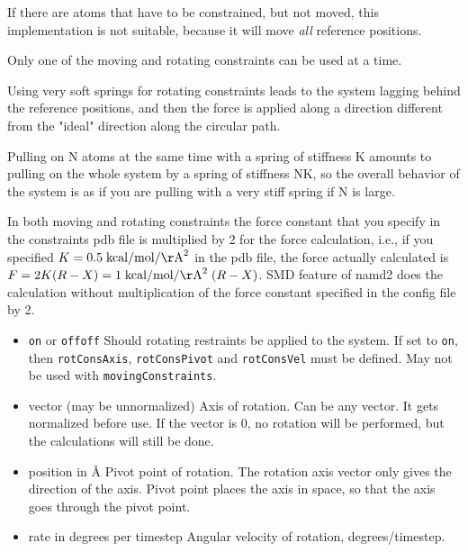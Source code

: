If there are atoms that have to be constrained, but not moved,
this implementation is not suitable, because it will move {\em all}
reference positions.

Only one of the moving and rotating constraints can be used at a
time.

Using very soft springs for rotating constraints leads to the system
   lagging behind the reference positions, and then the force is applied
   along a direction different from the "ideal" direction along the
   circular path.

Pulling on N atoms at the same time with a spring of stiffness K
   amounts to pulling on the whole system by a spring of stiffness NK,
   so the overall behavior of the system is as if you are pulling with a
   very stiff spring if N is large.

In both moving and rotating constraints the force constant that you
   specify in the constraints pdb file is multiplied by 2 for the force
   calculation, i.e., if you specified $K = 0.5 \; {\rm kcal}/{\rm mol}/{\rm \AA}^2$ in the pdb
file,
   the force actually calculated is $F = 2 K (R-X) = 1 \; {\rm kcal}/{\rm mol}/{\rm \AA}^2 \; (R-X)$.
   SMD feature of namd2 does the calculation without multiplication of
the
   force constant specified in the config file by 2.


\begin{itemize}

\item
{}
{{\tt on} or {\tt off}}{{\tt off}}
{Should rotating restraints be applied to the system. If set
to {\tt on}, then {\tt rotConsAxis}, {\tt rotConsPivot} and
{\tt rotConsVel} must be defined.
May not be used with {\tt movingConstraints}.}

\item
{}
{vector (may be unnormalized)}
{Axis of rotation. Can be any vector. It gets
normalized before use. If the vector is 0,
no rotation will be performed, but the calculations
will still be done.}

\item
{}
{position in \AA}
{Pivot point of rotation. The rotation axis vector
only gives the direction of the axis. Pivot point
places the axis in space, so that the axis goes
through the pivot point.}

\item
{}
{rate in degrees per timestep}
{Angular velocity of rotation, degrees/timestep.}

\end{itemize}

